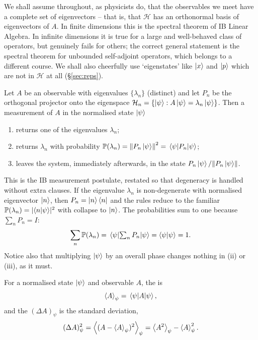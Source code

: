 \documentclass[a4paper]{scrartcl}
\begin{document}
We shall assume throughout, as physicists do, that the observables we meet have a complete set of eigenvectors -- that is, that $\mathcal{H}$ has an orthonormal basis of eigenvectors of $A$. In finite dimensions this is the spectral theorem of IB Linear Algebra. In infinite dimensions it is true for a large and well-behaved class of operators, but genuinely fails for others; the correct general statement is the spectral theorem for unbounded self-adjoint operators, which belongs to a different course. We shall also cheerfully use `eigenstates' like $\ket{x}$ and $\ket{p}$ which are not in $\mathcal{H}$ at all (\S\ref{sec:reps}).

\begin{axiom}[Measurement]
    Let $A$ be an observable with eigenvalues $\{\lambda_n\}$ (distinct) and let $P_n$ be the orthogonal projector onto the eigenspace $\mathcal{H}_n = \{\ket{\psi} : A\ket{\psi} = \lambda_n \ket{\psi}\}$. Then a measurement of $A$ in the normalised state $\ket{\psi}$
    \begin{enumerate}[label=(\roman*)]
        \item returns one of the eigenvalues $\lambda_n$;
        \item returns $\lambda_n$ with probability $\mathbb{P}(\lambda_n) = \norm{P_n \ket{\psi}}^2 = \mel{\psi}{P_n}{\psi}$;
        \item leaves the system, immediately afterwards, in the state $P_n\ket{\psi} / \norm{P_n\ket{\psi}}$.
    \end{enumerate}
\end{axiom}

This is the IB measurement postulate, restated so that degeneracy is handled without extra clauses. If the eigenvalue $\lambda_n$ is non-degenerate with normalised eigenvector $\ket{n}$, then $P_n = \ket{n}\bra{n}$ and the rules reduce to the familiar $\mathbb{P}(\lambda_n) = \lvert\braket{n}{\psi}\rvert^2$ with collapse to $\ket{n}$. The probabilities sum to one because $\sum_n P_n = I$:
$$
\sum_n \mathbb{P}(\lambda_n) = \mel{\psi}{\textstyle\sum_n P_n}{\psi} = \braket{\psi}{\psi} = 1.
$$
Notice also that multiplying $\ket{\psi}$ by an overall phase changes nothing in (ii) or (iii), as it must.

\begin{definition}
    For a normalised state $\ket{\psi}$ and observable $A$, the  is
    $$
    \expval{A}_\psi = \mel{\psi}{A}{\psi},
    $$
    and the  $(\Delta A)_\psi$ is the standard deviation,
    $$
    (\Delta A)_\psi^2 = \expval{(A - \expval{A}_\psi)^2}_\psi = \expval{A^2}_\psi - \expval{A}_\psi^2.
    $$
\end{definition}
\end{document}
